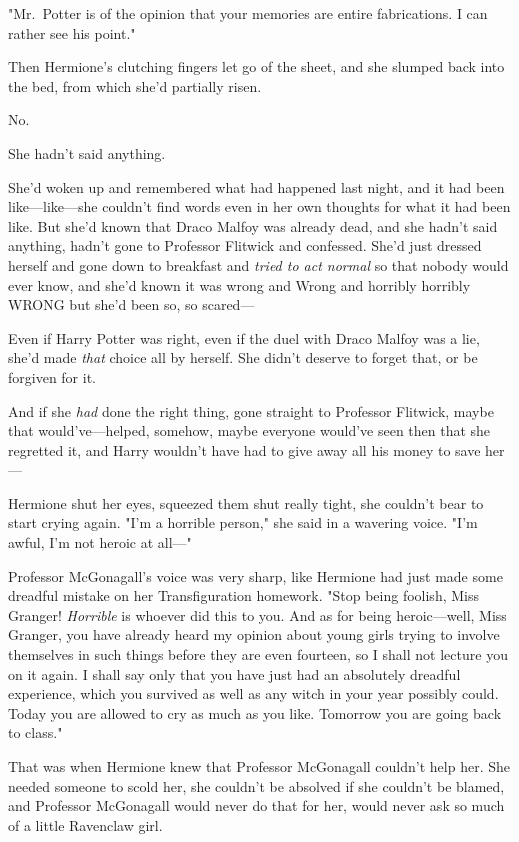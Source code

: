"Mr.~Potter is of the opinion that your memories are entire fabrications. I can
rather see his point."

Then Hermione's clutching fingers let go of the sheet, and she slumped back
into the bed, from which she'd partially risen.

No.

She hadn't said anything.

She'd woken up and remembered what had happened last night, and it had been
like---like---she couldn't find words even in her own thoughts for what it had
been like. But she'd known that Draco Malfoy was already dead, and she hadn't
said anything, hadn't gone to Professor Flitwick and confessed. She'd just
dressed herself and gone down to breakfast and \emph{tried to act normal} so
that nobody would ever know, and she'd known it was wrong and Wrong and
horribly horribly WRONG but she'd been so, so scared---

Even if Harry Potter was right, even if the duel with Draco Malfoy was a lie,
she'd made \emph{that} choice all by herself. She didn't deserve to forget
that, or be forgiven for it.

And if she \emph{had} done the right thing, gone straight to Professor
Flitwick, maybe that would've---helped, somehow, maybe everyone would've seen
then that she regretted it, and Harry wouldn't have had to give away all his
money to save her---

Hermione shut her eyes, squeezed them shut really tight, she couldn't bear to
start crying again. "I'm a horrible person," she said in a wavering voice. "I'm
awful, I'm not heroic at all---"

Professor McGonagall's voice was very sharp, like Hermione had just made some
dreadful mistake on her Transfiguration homework. "Stop being foolish, Miss
Granger! \emph{Horrible} is whoever did this to you. And as for being
heroic---well, Miss Granger, you have already heard my opinion about young
girls trying to involve themselves in such things before they are even
fourteen, so I shall not lecture you on it again. I shall say only that you
have just had an absolutely dreadful experience, which you survived as well as
any witch in your year possibly could. Today you are allowed to cry as much as
you like. Tomorrow you are going back to class."

That was when Hermione knew that Professor McGonagall couldn't help her. She
needed someone to scold her, she couldn't be absolved if she couldn't be
blamed, and Professor McGonagall would never do that for her, would never ask
so much of a little Ravenclaw girl.

